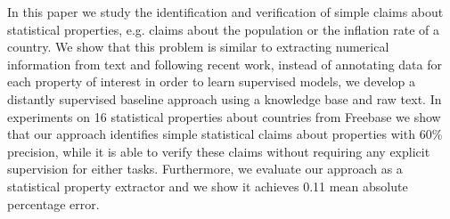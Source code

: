 In this paper we study the identification and verification of simple claims about statistical properties, e.g. claims about the population or the inflation rate of a country. We show that this problem is similar to extracting numerical information from text and following recent work, instead of annotating data for each property of interest in order to learn supervised models, we develop a distantly supervised baseline approach using a knowledge base and raw text. In experiments on 16 statistical properties about countries from Freebase we show that our approach  identifies simple statistical claims about properties with 60\% precision, while it is able to verify these claims without requiring any explicit supervision for either tasks. Furthermore, we evaluate our approach as a statistical property extractor and we show it achieves 0.11 mean absolute percentage error.

